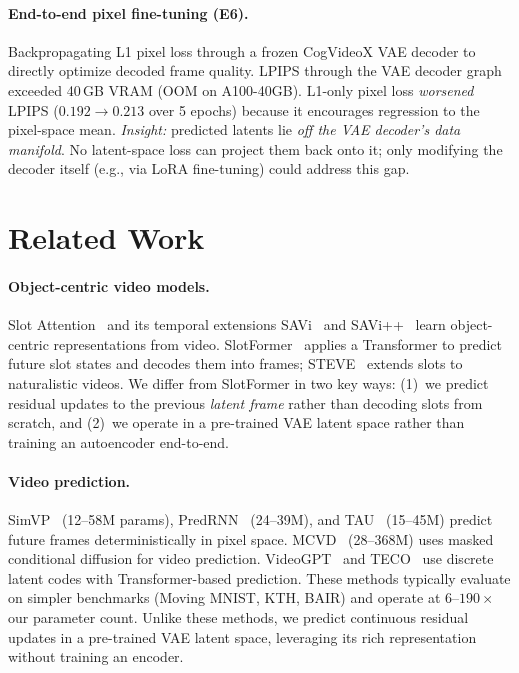 \documentclass{article}
\begin{document}
\paragraph{End-to-end pixel fine-tuning (E6).}
Backpropagating L1 pixel loss through a frozen CogVideoX VAE decoder
to directly optimize decoded frame quality.
LPIPS through the VAE decoder graph exceeded 40\,GB VRAM (OOM on
A100-40GB).
L1-only pixel loss \emph{worsened} LPIPS ($0.192 \to 0.213$ over 5
epochs) because it encourages regression to the pixel-space mean.
\textit{Insight:} predicted latents lie \emph{off the VAE decoder's
data manifold}.
No latent-space loss can project them back onto it; only modifying the
decoder itself (e.g., via LoRA fine-tuning) could address this gap.

\section{Related Work}
\label{sec:related}

\paragraph{Object-centric video models.}
Slot Attention~\cite{locatello2020object} and its temporal extensions
SAVi~\cite{kipf2022conditional} and SAVi++~\cite{elsayed2022savi++}
learn object-centric representations from video.
SlotFormer~\cite{wu2023slotformer} applies a Transformer to predict
future slot states and decodes them into frames; STEVE~\cite{singh2022steve}
extends slots to naturalistic videos.
We differ from SlotFormer in two key ways: (1)~we predict residual
updates to the previous \emph{latent frame} rather than decoding
slots from scratch, and (2)~we operate in a pre-trained VAE latent
space rather than training an autoencoder end-to-end.

\paragraph{Video prediction.}
SimVP~\cite{gao2022simvp} (12--58M params),
PredRNN~\cite{wang2022predrnn} (24--39M), and
TAU~\cite{tan2023temporal} (15--45M) predict future frames
deterministically in pixel space.
MCVD~\cite{voleti2022mcvd} (28--368M) uses masked conditional
diffusion for video prediction.
VideoGPT~\cite{yan2021videogpt} and TECO~\cite{yan2023teco}
use discrete latent codes with Transformer-based prediction.
These methods typically evaluate on simpler benchmarks (Moving MNIST,
KTH, BAIR) and operate at $6$--$190\times$ our parameter count.
Unlike these methods, we predict continuous residual updates in a
pre-trained VAE latent space, leveraging its rich representation
without training an encoder.
\end{document}
